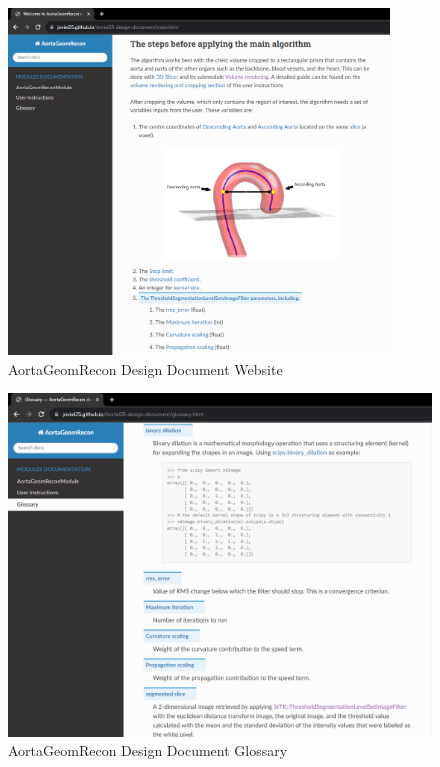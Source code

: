 \begin{figure}[H]
    \centering
    \includegraphics[width=0.9\textwidth]{figures/AC/DD/Main_page.png}
    \caption[AortaGeomRecon Design Document Website]{AortaGeomRecon Design Document Website}
    \label{fig_agr_dd}
\end{figure}

\begin{figure}[H]
    \centering
    \includegraphics[width=\textwidth]{figures/AC/DD/Glossary.png}
    \caption[AortaGeomRecon Design Document Glossary]{AortaGeomRecon Design Document Glossary}
    \label{fig_agr_dd_glossary}
\end{figure}

